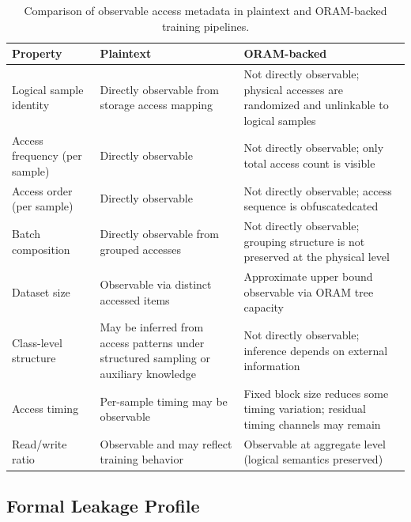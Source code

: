 \documentclass{llncs}
\begin{document}
\begin{table}[t]
\centering
\small
\caption{Comparison of observable access metadata in plaintext and ORAM-backed training pipelines.}
\label{tab:access_patterns}
\begin{tabular}{@{}p{3.2cm}p{3.6cm}p{4.4cm}@{}}
\toprule
\textbf{Property} & \textbf{Plaintext} & \textbf{ORAM-backed} \\
\midrule

Logical sample identity &
Directly observable from storage access mapping &
Not directly observable; physical accesses are randomized and unlinkable to logical samples \\
\addlinespace

Access frequency (per sample) &
Directly observable &
Not directly observable; only total access count is visible \\
\addlinespace

Access order (per sample) &
Directly observable &
Not directly observable; access sequence is obfuscatedcated \\
\addlinespace

Batch composition &
Directly observable from grouped accesses &
Not directly observable; grouping structure is not preserved at the physical level \\
\addlinespace

Dataset size &
Observable via distinct accessed items &
Approximate upper bound observable via ORAM tree capacity \\
\addlinespace

Class-level structure &
May be inferred from access patterns under structured sampling or auxiliary knowledge &
Not directly observable; inference depends on external information \\
\addlinespace

Access timing &
Per-sample timing may be observable &
Fixed block size reduces some timing variation; residual timing channels may remain \\
\addlinespace

Read/write ratio &
Observable and may reflect training behavior &
Observable at aggregate level (logical semantics preserved) \\

\bottomrule
\end{tabular}
\end{table}

\subsection{Formal Leakage Profile}
\end{document}
